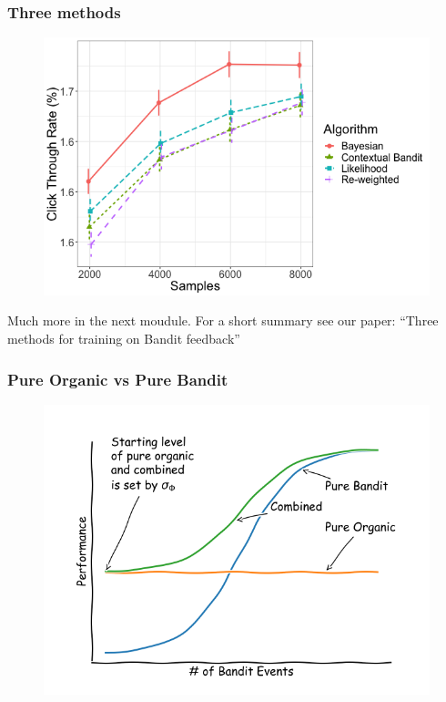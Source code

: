\begin{frame}
  \frametitle{Three methods}
\begin{figure}[h!]
\includegraphics[scale=0.45]{images/inv_pop_sampling_run.png}
\centering
\end{figure}

Much more in the next moudule.  For a short summary see our paper: ``Three methods for training on Bandit feedback''

\end{frame}







\begin{frame}
  \frametitle{Pure Organic vs Pure Bandit}
\begin{figure}[h!]
\includegraphics[scale=0.45]{images/pureorganicpurebandit.png}
\centering
\end{figure}
\end{frame}






